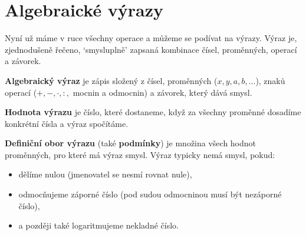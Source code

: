 \section{Algebraické výrazy}\label{sec:algebraicke-vyrazy}

Nyní už máme v ruce všechny operace a můžeme se podívat na výrazy. Výraz je, zjednodušeně řečeno, `smysluplně' zapsaná kombinace čísel, proměnných, operací a závorek.

\begin{definitionbox}
  \textbf{Algebraický výraz} je zápis složený z čísel, proměnných ($x, y, a, b, \ldots$), znaků operací ($+, -, \cdot, :,$ mocnin a odmocnin) a závorek, který dává smysl.

  \textbf{Hodnota výrazu} je číslo, které dostaneme, když za všechny proměnné dosadíme konkrétní čísla a výraz spočítáme.

  \textbf{Definiční obor výrazu} (také \textbf{podmínky}) je množina všech hodnot proměnných, pro které má výraz smysl. Výraz typicky nemá smysl, pokud:
  \begin{itemize}
    \item dělíme nulou (jmenovatel se nesmí rovnat nule),
    \item odmocňujeme záporné číslo (pod sudou odmocninou musí být nezáporné číslo),
    \item a později také logaritmujeme nekladné číslo.
  \end{itemize}
\end{definitionbox}


